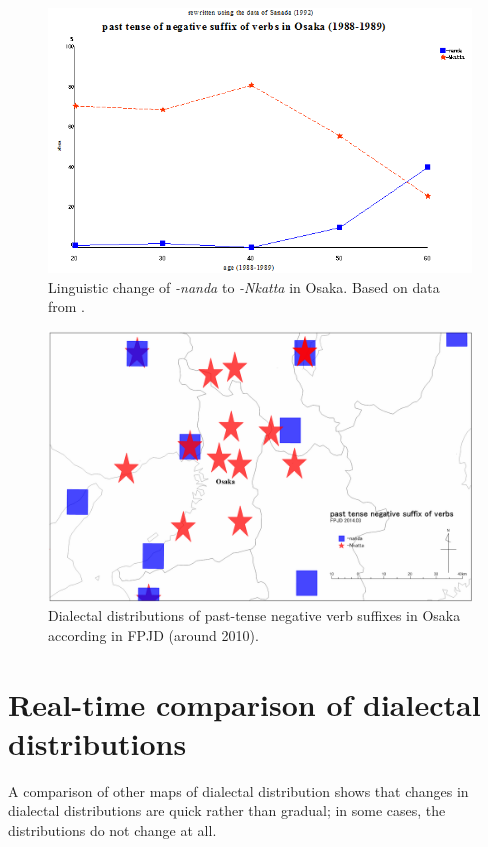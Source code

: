\documentclass[output=paper]{LSP/langsci}
\begin{document}
 
\begin{figure}
\includegraphics[width=\textwidth]{illustrations/onishi_fig3}
\caption{Linguistic change of \textit{-nanda} to \textit{-Nkatta} in Osaka. Based on data from \citet{sanada_kansaihougen-no_1992}.}
\label{fig:3}
\end{figure}

\begin{figure}
\includegraphics[width=\textwidth]{illustrations/onishi_fig4}
\caption{Dialectal distributions of past-tense negative verb suffixes in Osaka according in FPJD (around 2010).}
\label{fig:4}
\end{figure}

\section{Real-time comparison of dialectal distributions}
A comparison of other maps of dialectal distribution shows that changes in dialectal distributions are quick rather than gradual; in some cases, the distributions do not change at all.
\end{document}
